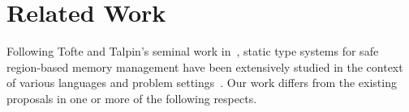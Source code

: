 \section{Related Work}
\label{sec:related-work}


Following Tofte and Talpin's seminal work in~\cite{tofte93,tofte94,tofte97},
static type systems for safe region-based memory
management have been extensively studied in the context of various
languages and problem settings~\cite{cyclone02,cyclone04,yates99,MIT03,DPJ09,HMN01,WW01,rust,gpu14}.
Our work differs from the
existing proposals in one or more of the following respects.

